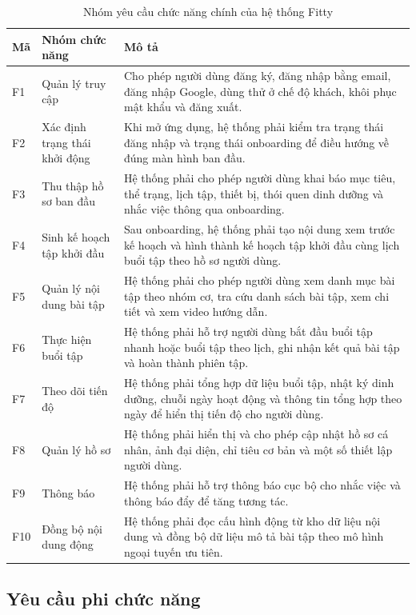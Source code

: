 \begin{table}[H]
\centering
\caption{Nhóm yêu cầu chức năng chính của hệ thống Fitty}
\begin{tabular}{|p{1.5cm}|p{4.3cm}|p{7.2cm}|}
\hline
\textbf{Mã} & \textbf{Nhóm chức năng} & \textbf{Mô tả} \\ \hline
F1 & Quản lý truy cập & Cho phép người dùng đăng ký, đăng nhập bằng email, đăng nhập Google, dùng thử ở chế độ khách, khôi phục mật khẩu và đăng xuất. \\ \hline
F2 & Xác định trạng thái khởi động & Khi mở ứng dụng, hệ thống phải kiểm tra trạng thái đăng nhập và trạng thái onboarding để điều hướng về đúng màn hình ban đầu. \\ \hline
F3 & Thu thập hồ sơ ban đầu & Hệ thống phải cho phép người dùng khai báo mục tiêu, thể trạng, lịch tập, thiết bị, thói quen dinh dưỡng và nhắc việc thông qua onboarding. \\ \hline
F4 & Sinh kế hoạch tập khởi đầu & Sau onboarding, hệ thống phải tạo nội dung xem trước kế hoạch và hình thành kế hoạch tập khởi đầu cùng lịch buổi tập theo hồ sơ người dùng. \\ \hline
F5 & Quản lý nội dung bài tập & Hệ thống phải cho phép người dùng xem danh mục bài tập theo nhóm cơ, tra cứu danh sách bài tập, xem chi tiết và xem video hướng dẫn. \\ \hline
F6 & Thực hiện buổi tập & Hệ thống phải hỗ trợ người dùng bắt đầu buổi tập nhanh hoặc buổi tập theo lịch, ghi nhận kết quả bài tập và hoàn thành phiên tập. \\ \hline
F7 & Theo dõi tiến độ & Hệ thống phải tổng hợp dữ liệu buổi tập, nhật ký dinh dưỡng, chuỗi ngày hoạt động và thông tin tổng hợp theo ngày để hiển thị tiến độ cho người dùng. \\ \hline
F8 & Quản lý hồ sơ & Hệ thống phải hiển thị và cho phép cập nhật hồ sơ cá nhân, ảnh đại diện, chỉ tiêu cơ bản và một số thiết lập người dùng. \\ \hline
F9 & Thông báo & Hệ thống phải hỗ trợ thông báo cục bộ cho nhắc việc và thông báo đẩy để tăng tương tác. \\ \hline
F10 & Đồng bộ nội dung động & Hệ thống phải đọc cấu hình động từ kho dữ liệu nội dung và đồng bộ dữ liệu mô tả bài tập theo mô hình ngoại tuyến ưu tiên. \\ \hline
\end{tabular}
\end{table}

\subsection{Yêu cầu phi chức năng}

